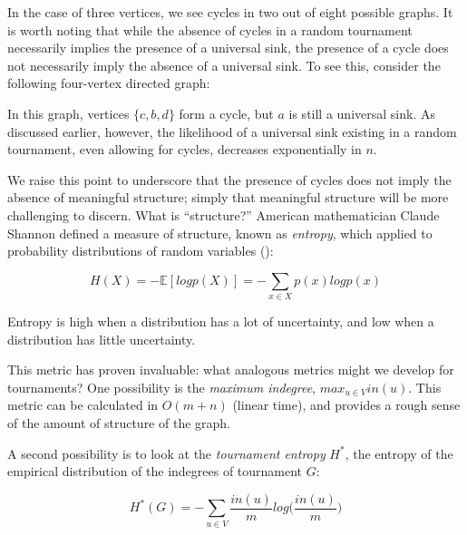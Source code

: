 In the case of three vertices, we see cycles in two out of eight possible graphs.
It is worth noting that while the absence of cycles in a random tournament necessarily implies the presence of a universal sink, the presence of a cycle does not necessarily imply the absence of a universal sink.
To see this, consider the following four-vertex directed graph:

\begin{center}
\end{center}

In this graph, vertices $\{c, b, d\}$ form a cycle, but $a$ is still a universal sink.
As discussed earlier, however, the likelihood of a universal sink existing in a random tournament, even allowing for cycles, decreases exponentially in $n$.

\bigskip

We raise this point to underscore that the presence of cycles does not imply the absence of meaningful structure; simply that meaningful structure will be more challenging to discern.
What is ``structure?''
American mathematician Claude Shannon defined a measure of structure, known as \textit{entropy}, which applied to probability distributions of random variables (\cite{cover}):

\[
H(X) = -\mathbb{E}[logp(X)] = -\sum_{x \in X}p(x)logp(x)
\]

Entropy is high when a distribution has a lot of uncertainty, and low when a distribution has little uncertainty.

This metric has proven invaluable: what analogous metrics might we develop for tournaments?
One possibility is the \textit{maximum indegree}, $max_{u \in V}in(u)$.
This metric can be calculated in $O(m + n)$ (linear time), and provides a rough sense of the amount of structure of the graph.

A second possibility is to look at the \textit{tournament entropy} $H^*$, the entropy of the empirical distribution of the indegrees of tournament $G$:

\[
H^*(G) = -\sum_{u \in V} \frac{in(u)}{m}log\bigg(\frac{in(u)}{m}\bigg)
\]

